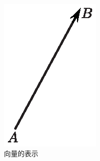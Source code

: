 \begin{enumerate}[]
\begin{figure}[h]
\begin{minipage}{0.2\linewidth}
			\includegraphics[width=0.9\linewidth]{picture/C-1/1.1/xl1}
			\caption{向量的表示}
			\label{向量}
		\end{minipage}%
	\end{figure}
\end{enumerate}

